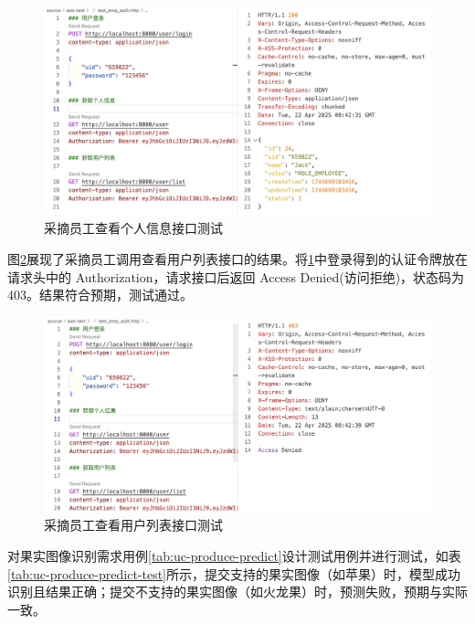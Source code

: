 \begin{figure}[H]
    \centering
    \includegraphics[width=0.9\linewidth]{../result/rest-test-user-login-emp.png}
    \caption{采摘员工查看个人信息接口测试}
    \label{fig:rest-test-user-login-emp}
\end{figure}

图\ref{fig:rest-test-user-list-emp}展现了采摘员工调用查看用户列表接口的结果。将\ref{fig:rest-test-user-login-emp}中登录得到的认证令牌放在请求头中的 Authorization，请求接口后返回 Access Denied(访问拒绝)，状态码为 403。结果符合预期，测试通过。

\begin{figure}[H]
    \centering
    \includegraphics[width=0.9\linewidth]{../result/rest-test-user-list-emp.png}
    \caption{采摘员工查看用户列表接口测试}
    \label{fig:rest-test-user-list-emp}
\end{figure}

对果实图像识别需求用例\ref{tab:uc-produce-predict}设计测试用例并进行测试，如表\ref{tab:uc-produce-predict-test}所示，提交支持的果实图像（如苹果）时，模型成功识别且结果正确；提交不支持的果实图像（如火龙果）时，预测失败，预期与实际一致。

